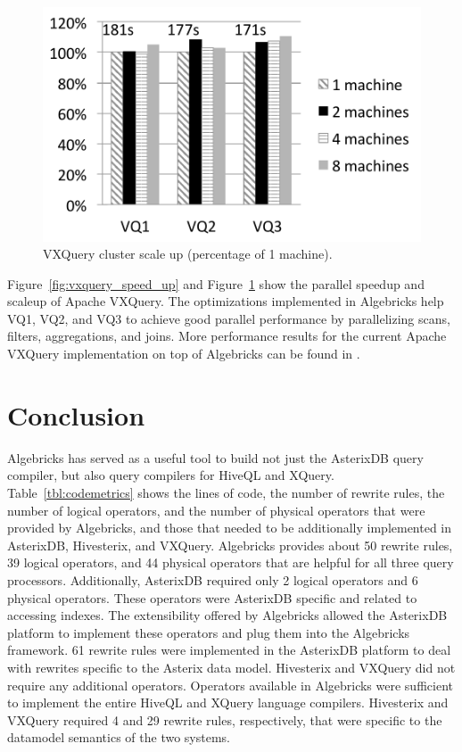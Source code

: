 \begin{figure}[tb]
\includegraphics[width=\columnfigurewidth]{images/vxquery_scale_up}
\centering
\vspace{-2ex}
\caption{VXQuery cluster scale up (percentage of 1 machine).}
\label{fig:vxquery_scale_up}
\end{figure}

Figure~\ref{fig:vxquery_speed_up} and Figure~\ref{fig:vxquery_scale_up} show the parallel speedup and scaleup of Apache VXQuery. The optimizations implemented in Algebricks help VQ1, VQ2, and VQ3 to achieve good parallel performance by parallelizing scans, filters, aggregations, and joins.
More performance results for the current Apache VXQuery implementation on top of Algebricks can be found in \cite{Carman:2015}.

\section{Conclusion}

Algebricks has served as a useful tool to build not just the AsterixDB query compiler, but also query compilers for HiveQL and XQuery. Table~\ref{tbl:codemetrics} shows the lines of code, the number of rewrite rules, the number of logical operators, and the number of physical operators that were provided by Algebricks, and those that needed to be additionally implemented in AsterixDB, Hivesterix, and VXQuery. Algebricks provides about 50 rewrite rules, 39 logical operators, and 44 physical operators that are helpful for all three query processors. Additionally, AsterixDB required only 2 logical operators and 6 physical operators. These operators were AsterixDB specific and related to accessing indexes. The extensibility offered by Algebricks allowed the AsterixDB platform to implement these operators and plug them into the Algebricks framework. 61 rewrite rules were implemented in the AsterixDB platform to deal with rewrites specific to the Asterix data model. Hivesterix and VXQuery did not require any additional operators. Operators available in Algebricks were sufficient to implement the entire HiveQL and XQuery language compilers. Hivesterix and VXQuery required 4 and 29 rewrite rules, respectively, that were specific to the datamodel semantics of the two systems.


